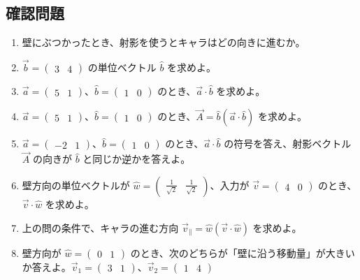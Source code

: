 \documentclass[paper=a4,fleqn,11pt]{jlreq}
\begin{document}
\subsection{確認問題}
\begin{enumerate}
  \item 壁にぶつかったとき、射影を使うとキャラはどの向きに進むか。
  \item \(\vec{b}=\begin{pmatrix}3 & 4\end{pmatrix}\) の単位ベクトル \(\hat{b}\) を求めよ。
  \item \(\vec{a}=\begin{pmatrix}5 & 1\end{pmatrix}\)、\(\hat{b}=\begin{pmatrix}1 & 0\end{pmatrix}\) のとき、\(\vec{a}\cdot\hat{b}\) を求めよ。
  \item \(\vec{a}=\begin{pmatrix}5 & 1\end{pmatrix}\)、\(\hat{b}=\begin{pmatrix}1 & 0\end{pmatrix}\) のとき、\(\vec{A}=\hat{b}(\vec{a}\cdot\hat{b})\) を求めよ。
  \item \(\vec{a}=\begin{pmatrix}-2 & 1\end{pmatrix}\)、\(\hat{b}=\begin{pmatrix}1 & 0\end{pmatrix}\) のとき、\(\vec{a}\cdot\hat{b}\) の符号を答え、射影ベクトル \(\vec{A}\) の向きが \(\hat{b}\) と同じか逆かを答えよ。
  \item 壁方向の単位ベクトルが \(\hat{w}=\begin{pmatrix}\frac{1}{\sqrt{2}} & \frac{1}{\sqrt{2}}\end{pmatrix}\)、入力が \(\vec{v}=\begin{pmatrix}4 & 0\end{pmatrix}\) のとき、\(\vec{v}\cdot\hat{w}\) を求めよ。
  \item 上の問の条件で、キャラの進む方向 \(\vec{v}_{\parallel}=\hat{w}(\vec{v}\cdot\hat{w})\) を求めよ。
  \item 壁方向が \(\hat{w}=\begin{pmatrix}0 & 1\end{pmatrix}\) のとき、次のどちらが「壁に沿う移動量」が大きいか答えよ。\(\vec{v}_1=\begin{pmatrix}3 & 1\end{pmatrix}\)、\(\vec{v}_2=\begin{pmatrix}1 & 4\end{pmatrix}\)
\end{enumerate}
\end{document}
